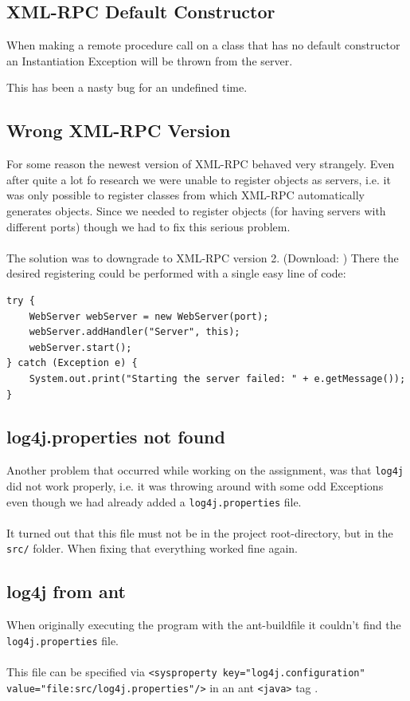 \documentclass[11pt, a4paper]{article}
\begin{document}
\subsection{XML-RPC Default Constructor}

When making a remote procedure call on a class that has no default
constructor an Instantiation Exception will be thrown from the server.

This has been a nasty bug for an undefined time. 

\subsection{Wrong XML-RPC Version}

For some reason the newest version of XML-RPC behaved very strangely. Even after quite a lot fo research we were unable to register objects as servers, i.e. it was only possible to register classes from which XML-RPC automatically generates objects. Since we needed to register objects (for having servers with different ports) though we had to fix this serious problem.
\\\\
The solution was to downgrade to XML-RPC version 2. (Download: \cite{xmlrpc-v2}) There the desired registering could be performed with a single easy line of code:

\vspace{5pt}
\begin{lstlisting}
try {
    WebServer webServer = new WebServer(port);
    webServer.addHandler("Server", this);
    webServer.start();
} catch (Exception e) {
    System.out.print("Starting the server failed: " + e.getMessage());
}
\end{lstlisting}

\subsection{log4j.properties not found}

Another problem that occurred while working on the assignment, was that \lstinline|log4j| \cite{log} did not work properly, i.e. it was throwing around with some odd Exceptions even though we had already added a \lstinline|log4j.properties| file.
\\\\
It turned out that this file must not be in the project root-directory, but in the \lstinline|src/| folder. When fixing that everything worked fine again.

\subsection{log4j from ant}

When originally executing the program with the ant-buildfile it couldn't find the \lstinline|log4j.properties| file.
\\\\
This file can be specified via \lstinline|<sysproperty key="log4j.configuration" value="file:src/log4j.properties"/>| in an ant \lstinline|<java>| tag \cite{ant-log}.


\nocite{*}


\end{document}
